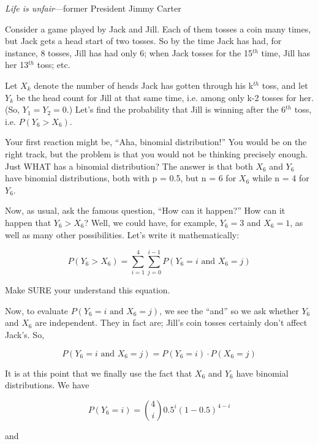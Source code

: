 {\it Life is unfair}---former President Jimmy Carter

\bigskip

Consider a game played by Jack and Jill. Each of them tosses a coin many
times, but Jack gets a head start of two tosses. So by the time Jack has
had, for instance, 8 tosses, Jill has had only 6; when Jack tosses for
the 15$^{th}$ time, Jill has her 13$^{th}$ toss; etc.

Let $X_k$ denote the number of heads Jack has gotten through his
k$^{th}$ toss, and let $Y_k$ be the head count for Jill at that same
time, i.e.  among only k-2 tosses for her. (So, $Y_1 = Y_2 = 0$.)
Let's find the probability that Jill is winning after the 6$^{th}$
toss, i.e. $P(Y_6 > X_6)$.

Your first reaction might be, ``Aha, binomial distribution!''  You would
be on the right track, but the problem is that you would not be thinking
precisely enough.  Just WHAT has a binomial distribution?  The answer is
that both $X_6$ and $Y_6$ have binomial distributions, both with p =
0.5, but n = 6 for $X_6$ while n = 4 for $Y_6$.

Now, as usual, ask the famous question, ``How can it happen?''  How can
it happen that  $Y_6 > X_6$?  Well, we could have, for example, $Y_6 = 3$
and $X_6 = 1$, as well as many other possibilities.  Let's write it
mathematically:

\begin{equation}
\label{ygx}
P(Y_6 > X_6) = \sum_{i=1}^4 \sum_{j=0}^{i-1} P(Y_6 = i \textrm{ and } X_6 = j)
\end{equation}

Make SURE your understand this equation.

Now, to evaluate $P(Y_6 = i \textrm{ and } X_6 = j)$, we see the ``and''
so we ask whether $Y_6$ and $X_6$ are independent.  They in fact are;
Jill's coin tosses certainly don't affect Jack's.  So,

\begin{equation}
P(Y_6 = i \textrm{ and } X_6 = j) =
P(Y_6 = i) \cdot P(X_6 = j)
\end{equation}

It is at this point that we finally use the fact that $X_6$ and $Y_6$
have binomial distributions.  We have

\begin{equation}
\label{y6}
P(Y_6 = i) = \binom{4}{i} 0.5^i (1-0.5)^{4-i}  
\end{equation}

and

